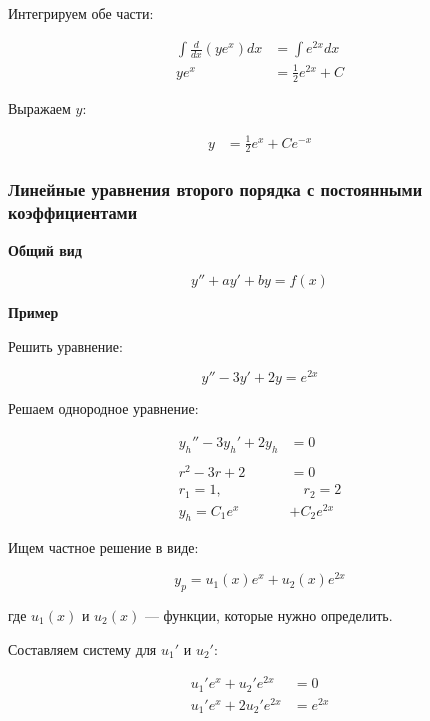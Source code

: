 Интегрируем обе части:

\begin{align*}
    \int \frac{d}{dx}(y e^x) dx &= \int e^{2x} dx \\
    y e^x &= \frac{1}{2} e^{2x} + C
\end{align*}

Выражаем $y$:

\begin{align*}
    y &= \frac{1}{2} e^x + C e^{-x}
\end{align*}

\subsubsection{Линейные уравнения второго порядка с постоянными коэффициентами}

\textbf{Общий вид}

\begin{equation*}
    y'' + a y' + b y = f(x)
\end{equation*}

\textbf{Пример}

Решить уравнение:

\begin{equation*}
    y'' - 3y' + 2y = e^{2x}
\end{equation*}

Решаем однородное уравнение:

\begin{align*}
    y_h'' - 3y_h' + 2y_h &= 0 \\ \\
    r^2 - 3r + 2 &= 0 \\
    r_1 = 1, &\quad r_2 = 2 \\
    y_h = C_1 e^x &+ C_2 e^{2x}
\end{align*}

Ищем частное решение в виде:

\begin{equation*}
    y_p = u_1(x) e^x + u_2(x) e^{2x}
\end{equation*}

где \(u_1(x)\) и \(u_2(x)\) — функции, которые нужно определить.

Составляем систему для \(u_1'\) и \(u_2'\):

\begin{align*}
    u_1' e^x + u_2' e^{2x} &= 0 \\
    u_1' e^x + 2 u_2' e^{2x} &= e^{2x}
\end{align*}

